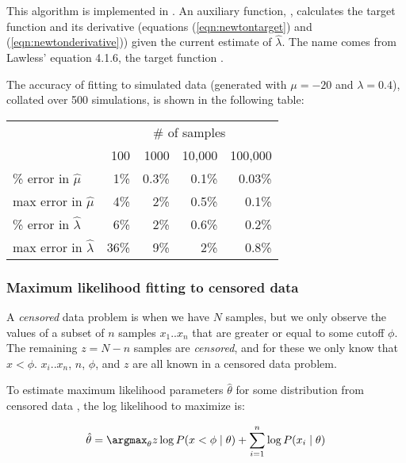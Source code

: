This algorithm is implemented in .  An
auxiliary function, , calculates the target
function and its derivative (equations (\ref{eqn:newtontarget}) and
(\ref{eqn:newtonderivative})) given the current estimate of
$\hat{\lambda}$.  The name comes from Lawless' equation 4.1.6, the
target function \citep{Lawless82}.

The accuracy of fitting to simulated data (generated with $\mu=-20$
and $\lambda=0.4$), collated over 500 simulations, is shown in the
following table:

\begin{center}
\begin{tabular}{lrrrr} \hline
                              & \multicolumn{4}{c}{\# of samples}\\
                              & 100 & 1000  & 10,000 & 100,000 \\
\% error in $\hat{\mu}$       &  1\%& 0.3\% &  0.1\% & 0.03\%  \\
max error in $\hat{\mu}$      &  4\%&   2\% &  0.5\% &  0.1\%  \\
\% error in $\hat{\lambda}$   &  6\%&   2\% &  0.6\% &  0.2\%  \\
max error in $\hat{\lambda}$  & 36\%&   9\% &    2\% &  0.8\%  \\ \hline
\end{tabular}
\end{center}





\subsubsection{Maximum likelihood fitting to censored data}

A \emph{censored} data problem is when we have $N$ samples, but we
only observe the values of a subset of $n$ samples $x_1..x_n$ that are
greater or equal to some cutoff $\phi$. The remaining $z = N-n$
samples are \emph{censored}, and for these we only know that $x <
\phi$.  $x_i..x_n$, $n$, $\phi$, and $z$ are all known in a censored
data problem.

To estimate maximum likelihood parameters $\hat{\theta}$ for some
distribution from censored data \citep{Gelman95}, the log likelihood
to maximize is:


\[ 
  \hat{\theta} = \argmax_{\theta} z \log P(x<\phi \mid \theta)
                         + \sum_{i=1}^n \log P(x_i \mid \theta)
\]

